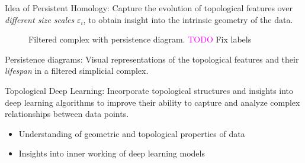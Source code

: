 \documentclass[11pt, a4paper]{amsart}
\begin{document}
Idea of Persistent Homology:
Capture the evolution of topological features over \emph{different size scales} $\varepsilon_{i}$, to obtain insight into the intrinsic geometry of the data.

\begin{figure}
	\centering
	\caption{
		Filtered complex with persistence diagram.
		\textcolor{magenta}{TODO} Fix labels
		\label{fig:persistence_diagram}
	}
\end{figure}

Persistence diagrams: 
Visual representations of the topological features and their \emph{lifespan} in a filtered simplicial complex.

Topological Deep Learning: 
Incorporate topological structures and insights into deep learning algorithms to improve their ability to capture and analyze complex relationships between data points.

\begin{itemize}
	\item Understanding of geometric and topological properties of data
	\item Insights into inner working of deep learning models
\end{itemize}
\end{document}
